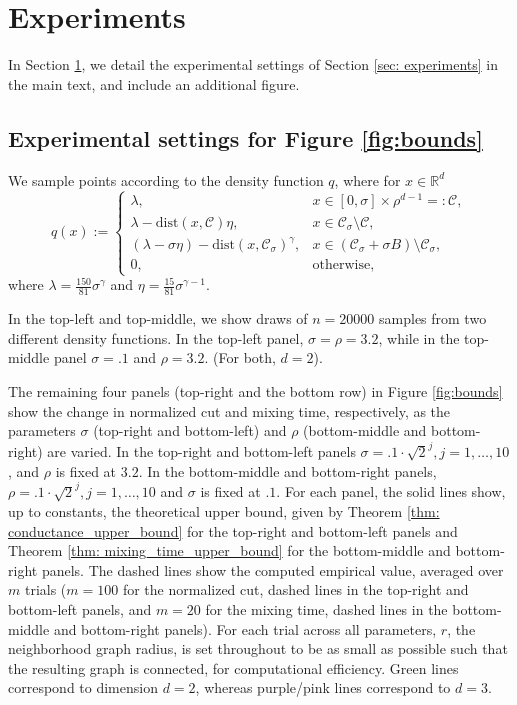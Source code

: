 \documentclass[11pt,twoside]{article}
\theoremstyle{definition}
\newcommand{\Reals}{\mathbb{R}}
\newcommand{\Rd}{\Reals^d}
\newcommand{\1}{\mathbbm{1}}
\newcommand{\dist}{\mathrm{dist}}
\newcommand{\Cset}{\mathcal{C}}
\newcommand{\Csig}{\Cset_{\sigma}}
\begin{document}
\section{Experiments}
\label{sec: experimental_setting}

In Section \ref{sec: experimental_setting}, we detail the experimental settings of Section \ref{sec: experiments} in the main text, and include an additional figure. 

\subsection{Experimental settings for Figure \ref{fig:bounds}}
We sample points according to the density function $q$, where for $x \in \Rd$
\begin{equation}
q(x) :=
\begin{cases}
\lambda,~ & x \in [0,\sigma] \times \rho^{d-1} =: \Cset, \\
\lambda - \dist(x,\Cset)\eta,~ & x \in \Csig \setminus \Cset, \\
(\lambda - \sigma \eta) - \dist(x,\Csig)^{\gamma}, & x \in (\Csig + \sigma B) \setminus \Csig, \\
0,~ & \textrm{otherwise},
\end{cases}
\end{equation}
where $\lambda = \frac{150}{81} \sigma^{\gamma}$ and $\eta = \frac{15}{81} \sigma^{\gamma - 1}$.

In the top-left and top-middle, we show draws of $n = 20000$ samples from two different density functions. In the top-left panel, $\sigma = \rho = 3.2$, while in the top-middle panel $\sigma = .1$ and $\rho = 3.2$. (For both, $d = 2$).

The remaining four panels (top-right and the bottom row) in Figure \ref{fig:bounds} show the change in normalized cut and mixing time, respectively, as the parameters $\sigma$ (top-right and bottom-left) and $\rho$ (bottom-middle and bottom-right) are varied. In the top-right and bottom-left panels $\sigma = .1 \cdot \sqrt{2}^j, j = 1,\ldots,10$, and $\rho$ is fixed at $3.2$. In the bottom-middle and bottom-right panels, $\rho = .1 \cdot \sqrt{2}^j, j = 1,\ldots,10$ and $\sigma$ is fixed at $.1$.
For each panel, the solid lines show, up to constants, the theoretical upper bound, given by Theorem \ref{thm: conductance_upper_bound} for the top-right and bottom-left panels and Theorem \ref{thm: mixing_time_upper_bound} for the bottom-middle and bottom-right panels. The dashed lines show the computed empirical value, averaged over $m$ trials ($m = 100$ for the normalized cut, dashed lines in the top-right and bottom-left panels, and $m = 20$ for the mixing time, dashed lines in the bottom-middle and bottom-right panels). For each trial across all parameters, $r$, the neighborhood graph radius, is set throughout to be as small as possible such that the resulting graph is connected, for computational efficiency. Green lines correspond to dimension $d = 2$, whereas purple/pink lines correspond to $d = 3$. 
\end{document}
